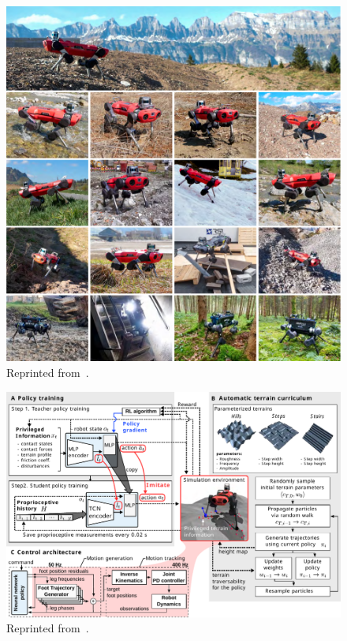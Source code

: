 \documentclass[12pt]{report}
\theoremstyle{definition}
\theoremstyle{remark}
\begin{document}
\begin{figure}[h]
    \centering
    \includegraphics[width=\linewidth]{figs/figure1.pdf}
    \caption{Reprinted from~\cite{lee_learning_2020}.}
    \label{fig:enter-label}
\end{figure}

\begin{figure}[h]
    \centering
    \includegraphics[width=\linewidth]{figs/figure4.pdf}
    \caption{Reprinted from~\cite{lee_learning_2020}.}
    \label{fig:enter-label}
\end{figure}
\end{document}

